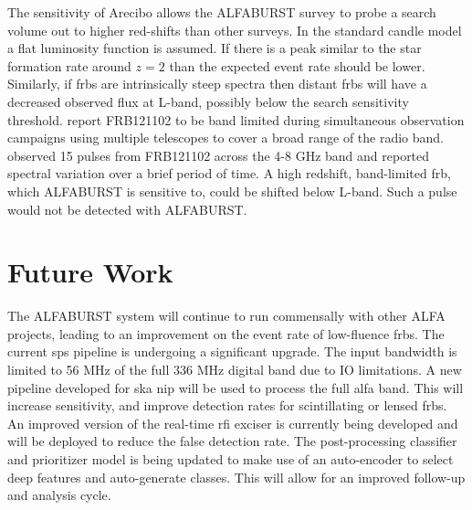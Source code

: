 \documentclass[a4paper,fleqn,usenatbib]{mnras}
\begin{document}
The sensitivity of Arecibo allows the ALFABURST survey to probe a search volume
out to higher red-shifts than other surveys. In the standard candle model a flat
luminosity function is assumed. If there is a peak similar to the star formation
rate around $z=2$ \citep{2014ARA&A..52..415M} than the expected event rate
should be lower. Similarly, if \glspl{frb} are intrinsically steep spectra then
distant \glspl{frb} will have a decreased observed flux at L-band, possibly
below the search sensitivity threshold. \cite{2017arXiv170507553L} report
FRB121102 to be band limited during simultaneous observation campaigns using
multiple telescopes to cover a broad range of the radio band. \cite{atel10675}
observed 15 pulses from FRB121102 across the 4-8 GHz band and reported spectral
variation over a brief period of time. A high redshift, band-limited \gls{frb},
which ALFABURST is sensitive to, could be shifted below L-band. Such a pulse
would not be detected with ALFABURST.


\section{Future Work}
\label{sec:future_work}

The ALFABURST system will continue to run commensally with other ALFA projects,
leading to an improvement on the event rate of low-fluence \glspl{frb}.  The
current \gls{sps} pipeline is undergoing a significant upgrade. The input
bandwidth is limited to 56 MHz of the full 336 MHz digital band due to IO
limitations. A new pipeline developed for \gls{ska} \gls{nip} will be used to
process the full \gls{alfa} band.  This will increase sensitivity, and improve
detection rates for scintillating or lensed \glspl{frb}.  An improved version of
the real-time \gls{rfi} exciser is currently being developed and will be
deployed to reduce the false detection rate. The post-processing classifier and
prioritizer model is being updated to make use of an auto-encoder to select deep
features and auto-generate classes. This will allow for an improved follow-up
and analysis cycle.
\end{document}
